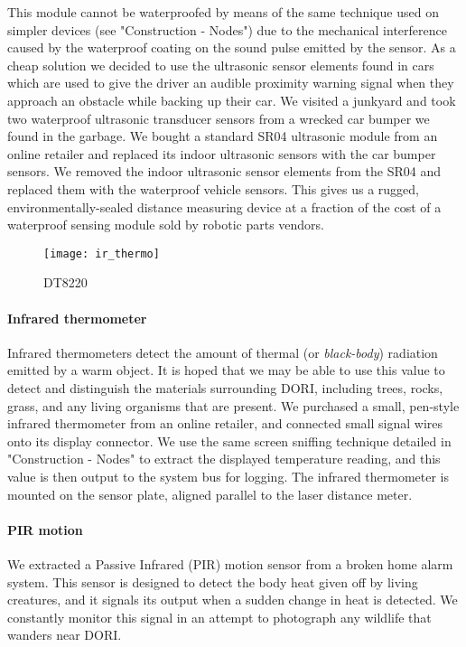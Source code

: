 \documentclass[12pt]{article}
\newcommand{\brand}{}
\begin{document}
    This module cannot be waterproofed by means of the same technique used on simpler devices (see "Construction - Nodes") due to the mechanical interference caused by the waterproof coating on the sound pulse emitted by the sensor. As a cheap solution we decided to use the ultrasonic sensor elements found in cars which are used to give the driver an audible proximity warning signal when they approach an obstacle while backing up their car. We visited a junkyard and took two waterproof ultrasonic transducer sensors from a wrecked car bumper we found in the garbage. We bought a standard \brand{SR04} ultrasonic module from an online retailer and replaced its indoor ultrasonic sensors with the car bumper sensors. We removed the indoor ultrasonic sensor elements from the \brand{SR04} and replaced them with the waterproof vehicle sensors. This gives us a rugged, environmentally-sealed distance measuring device at a fraction of the cost of a waterproof sensing module sold by robotic parts vendors.

    
    \begin{wrapfigure}{l}{0.25\textwidth}
        \centering
        \texttt{[image: ir\_thermo]}
        \caption*{DT8220}
    \end{wrapfigure}

    \paragraph*{Infrared thermometer}
    Infrared thermometers detect the amount of thermal (or \emph{black-body}) radiation emitted by a warm object. It is hoped that we may be able to use this value to detect and distinguish the materials surrounding DORI, including trees, rocks, grass, and any living organisms that are present. We purchased a small, pen-style infrared thermometer from an online retailer, and connected small signal wires onto its display connector. We use the same screen sniffing technique detailed in "Construction - Nodes" to extract the displayed temperature reading, and this value is then output to the system bus for logging. The infrared thermometer is mounted on the sensor plate, aligned parallel to the laser distance meter.


    \paragraph*{PIR motion}
We extracted a Passive Infrared (PIR) motion sensor from a broken home alarm system. This sensor is designed to detect the body heat given off by living creatures, and it signals its output when a sudden change in heat is detected. We constantly monitor this signal in an attempt to photograph any wildlife that wanders near \textsc{DORI}.
\end{document}
